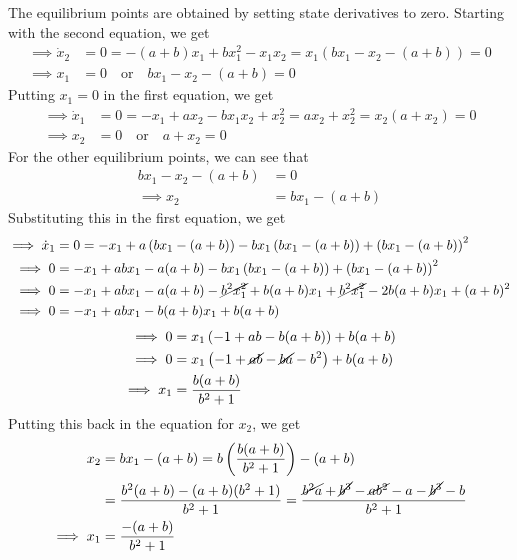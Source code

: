 The equilibrium points are obtained by setting state derivatives to zero.
Starting with the second equation, we get
\begin{align*}
    \implies
    \dot x_2
     & =
    0
    =
    -(a + b) x_1 + b x_1^2 - x_1 x_2
    =
    x_1 \left( b x_1 - x_2 - (a + b) \right)
    =
    0
    \\
    \implies
    x_1
     & =
    0
    \quad \text{or} \quad
    b x_1 - x_2 - (a + b)
    =
    0
\end{align*}
Putting \( x_1 = 0 \) in the first equation, we get
\begin{align*}
    \implies
    \dot x_1
     & =
    0
    =
    -x_1 + a x_2 - b x_1 x_2 + x_2^2
    =
    a x_2 + x_2^2
    =
    x_2 \left( a + x_2 \right)
    =
    0
    \\
    \implies
    x_2
     & =
    0
    \quad \text{or} \quad
    a + x_2
    =
    0
\end{align*}
For the other equilibrium points, we can see that
\begin{align*}
    b x_1 - x_2 - (a + b)
     & =
    0
    \\
    \implies
    x_2
     & =
    b x_1 - (a + b)
\end{align*}
Substituting this in the first equation, we get
\begin{align*}
    \implies
    \dot x_1
     & =
    0
    =
    -x_1 + a \left( b x_1 - (a + b) \right) - b x_1 \left( b x_1 - (a + b) \right) + \left( b x_1 - (a + b) \right)^2
    \\
    \implies
    0
     & =
    -x_1 + a b x_1 - a (a + b) - b x_1 \left( b x_1 - (a + b) \right) + \left( b x_1 - (a + b) \right)^2
    \\
    \implies
    0
     & =
    -x_1 + a b x_1 - a (a + b) - \cancel{b^2 x_1^2} + b (a + b) x_1 + \cancel{b^2 x_1^2} - 2 b (a + b) x_1 + (a + b)^2
    \\
    \implies
    0
     & =
    -x_1 + a b x_1 - b (a + b) x_1 + b(a + b)
\end{align*}
\begin{align*}
    \implies
    0
     & =
    x_1 \left( -1 + a b - b (a + b) \right) + b(a + b)
    \\
    \implies
    0
     & =
    x_1 \left( -1 + \cancel{a b} - \cancel{b a} - b^2 \right) + b(a + b)
    \\
    \implies
    x_1
     & =
    \frac{b(a + b)}{b^2 + 1}
\end{align*}
Putting this back in the equation for \( x_2 \), we get
\begin{align*}
    x_2
     & =
    b x_1 - (a + b)
    =
    b \left( \frac{b(a + b)}{b^2 + 1} \right) - (a + b)
    \\ & =
    \frac{b^2(a + b) - (a + b)(b^2 + 1)}{b^2 + 1}
    =
    \frac{\cancel{b^2 a} + \cancel{b^3} - \cancel{a b^2} - a - \cancel{b^3} - b}{b^2 + 1}
    \\
    \implies
    x_1
     & =
    \frac{-(a+b)}{b^2 + 1}
\end{align*}

